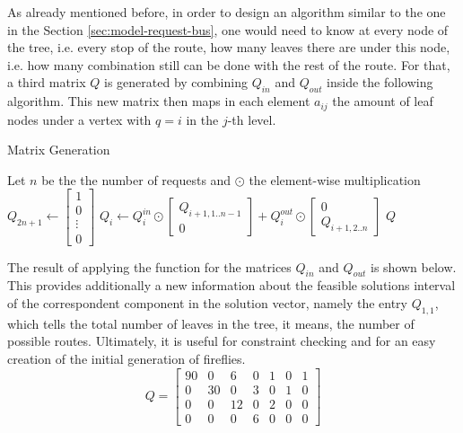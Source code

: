 \documentclass[tuberlin,cic,tc,openright,english,noabntcite,oneside]{iiufrgs}
\begin{document}
As already mentioned before, in order to design an algorithm similar to the one in the Section \ref{sec:model-request-bus}, one would need to know at every node of the tree, i.e. every stop of the route, how many leaves there are under this node, i.e. how many combination still can be done with the rest of the route. For that, a third matrix $Q$ is generated by combining $Q_{in}$ and $Q_{out}$ inside the following algorithm. This new matrix then maps in each element $a_{ij}$ the amount of leaf nodes under a vertex with $q=i$ in the $j$-th level.
\begin{algorithm}[H]
\caption{Matrix Generation}
\begin{algorithmic}
\State Let $n$ be the the number of requests and $\odot$ the element-wise multiplication
\State $\displaystyle Q_{2n+1} \gets \begin{bmatrix}1\\ 0 \\ \vdots \\0 \end{bmatrix}$
	\State $\displaystyle Q_{i} \gets Q^{in}_{i} \odot \begin{bmatrix}Q_{i+1,1..n-1} \\ 0\end{bmatrix}
	+ Q^{out}_{i} \odot \begin{bmatrix}0\\ Q_{i+1,2..n}\end{bmatrix}$
\EndFor
\State \Return $Q$
\EndFunction
\end{algorithmic}
\end{algorithm}

The result of applying the function for the matrices $Q_{in}$ and $Q_{out}$ is shown below. This provides additionally a new information about the feasible solutions interval of the correspondent component in the solution vector, namely the entry $Q_{1,1}$, which tells the total number of leaves in the tree, it means, the number of possible routes. Ultimately, it is useful for constraint checking and for an easy creation of the initial generation of fireflies.
$$
Q = 
\begin{bmatrix}
90 & 0 & 6 & 0 & 1 & 0 & 1\\
0 & 30 & 0 & 3 & 0 & 1 & 0\\
0 & 0 & 12 & 0 & 2 & 0 & 0\\
0 & 0 & 0 & 6 & 0 & 0 & 0
\end{bmatrix}
$$
\end{document}
